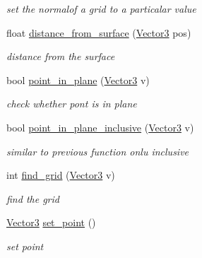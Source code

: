 \begin{DoxyCompactItemize}
\begin{DoxyCompactList}\small\item\em set the normalof a grid to a particalar value \end{DoxyCompactList}\item 
float \hyperlink{classgrid_af114a177215bf37a140f239da47c688d}{distance\+\_\+from\+\_\+surface} (\hyperlink{class_vector3}{Vector3} pos)
\begin{DoxyCompactList}\small\item\em distance from the surface \end{DoxyCompactList}\item 
bool \hyperlink{classgrid_ad5703af71bdd1872108f31d33f420cc8}{point\+\_\+in\+\_\+plane} (\hyperlink{class_vector3}{Vector3} v)
\begin{DoxyCompactList}\small\item\em check whether pont is in plane \end{DoxyCompactList}\item 
bool \hyperlink{classgrid_ac915d3be7b22d106f962fc5030565907}{point\+\_\+in\+\_\+plane\+\_\+inclusive} (\hyperlink{class_vector3}{Vector3} v)
\begin{DoxyCompactList}\small\item\em similar to previous function onlu inclusive \end{DoxyCompactList}\item 
int \hyperlink{classgrid_a9253c575a79f04292385dce2aa1000d3}{find\+\_\+grid} (\hyperlink{class_vector3}{Vector3} v)
\begin{DoxyCompactList}\small\item\em find the grid \end{DoxyCompactList}\item 
\hypertarget{classgrid_a77b694f27014401fa349f9a5a552cf55}{\hyperlink{class_vector3}{Vector3} \hyperlink{classgrid_a77b694f27014401fa349f9a5a552cf55}{set\+\_\+point} ()}\label{classgrid_a77b694f27014401fa349f9a5a552cf55}

\begin{DoxyCompactList}\small\item\em set point \end{DoxyCompactList}\end{DoxyCompactItemize}
